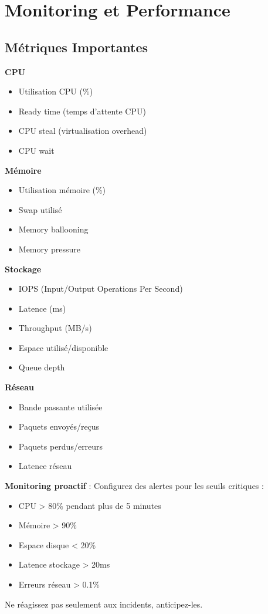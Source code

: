 \documentclass[11pt,a4paper]{article}
\begin{document}
\section{Monitoring et Performance}

\subsection{Métriques Importantes}

\textbf{CPU}
\begin{itemize}
    \item Utilisation CPU (\%)
    \item Ready time (temps d'attente CPU)
    \item CPU steal (virtualisation overhead)
    \item CPU wait
\end{itemize}

\textbf{Mémoire}
\begin{itemize}
    \item Utilisation mémoire (\%)
    \item Swap utilisé
    \item Memory ballooning
    \item Memory pressure
\end{itemize}

\textbf{Stockage}
\begin{itemize}
    \item IOPS (Input/Output Operations Per Second)
    \item Latence (ms)
    \item Throughput (MB/s)
    \item Espace utilisé/disponible
    \item Queue depth
\end{itemize}

\textbf{Réseau}
\begin{itemize}
    \item Bande passante utilisée
    \item Paquets envoyés/reçus
    \item Paquets perdus/erreurs
    \item Latence réseau
\end{itemize}

\begin{tipbox}
\textbf{Monitoring proactif} : Configurez des alertes pour les seuils critiques :
\begin{itemize}
    \item CPU > 80\% pendant plus de 5 minutes
    \item Mémoire > 90\%
    \item Espace disque < 20\%
    \item Latence stockage > 20ms
    \item Erreurs réseau > 0.1\%
\end{itemize}
Ne réagissez pas seulement aux incidents, anticipez-les.
\end{tipbox}
\end{document}
